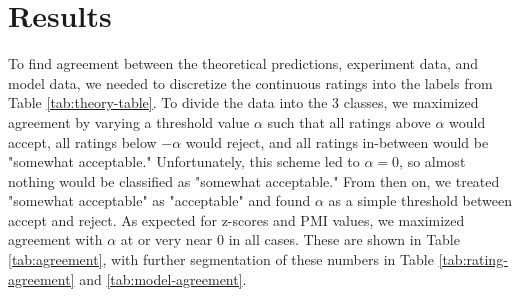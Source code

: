 \documentclass[11pt]{article}
\begin{document}
\section{Results}

To find agreement between the theoretical predictions, experiment data, and model data, we needed to discretize the continuous ratings into the labels from Table \ref{tab:theory-table}. To divide the data into the 3 classes, we maximized agreement by varying a threshold value $\alpha$ such that all ratings above $\alpha$ would accept, all ratings below $-\alpha$ would reject, and all ratings in-between would be "somewhat acceptable." Unfortunately, this scheme led to $\alpha=0$, so almost nothing would be classified as "somewhat acceptable." From then on, we treated "somewhat acceptable" as "acceptable" and found $\alpha$ as a simple threshold between accept and reject. As expected for z-scores and PMI values, we maximized agreement with $\alpha$ at or very near 0 in all cases. These are shown in Table \ref{tab:agreement}, with further segmentation of these numbers in Table \ref{tab:rating-agreement} and \ref{tab:model-agreement}.
\end{document}
